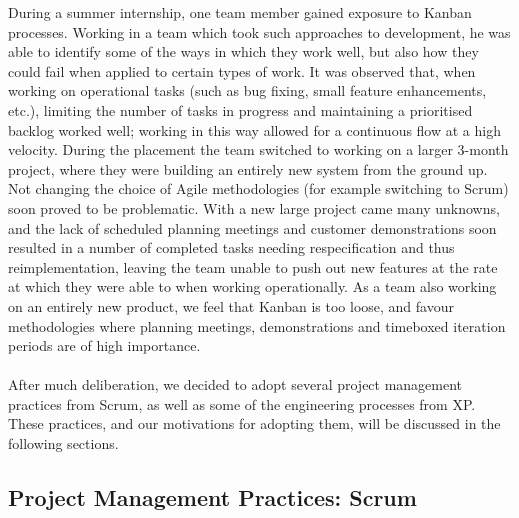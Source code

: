\documentclass[10pt]{article}
\begin{document}
During a summer internship, one team member gained exposure to Kanban processes. Working in a team which took such approaches to development, he was able to identify some of the ways in which they work well, but also how they could fail when applied to certain types of work. It was observed that, when working on operational tasks (such as bug fixing, small feature enhancements, etc.), limiting the number of tasks in progress and maintaining a prioritised backlog worked well; working in this way allowed for a continuous flow at a high velocity. During the placement the team switched to working on a larger 3-month project, where they were building an entirely new system from the ground up. Not changing the choice of Agile methodologies (for example switching to Scrum) soon proved to be problematic. With a new large project came many unknowns, and the lack of scheduled planning meetings and customer demonstrations soon resulted in a number of completed tasks needing respecification and thus reimplementation, leaving the team unable to push out new features at the rate at which they were able to when working operationally. As a team also working on an entirely new product, we feel that Kanban is too loose, and favour methodologies where planning meetings, demonstrations and timeboxed iteration periods are of high importance.\\\\
After much deliberation, we decided to adopt several project management practices from Scrum, as well as some of the engineering processes from XP. These practices, and our motivations for adopting them, will be discussed in the following sections.

\subsection{Project Management Practices: Scrum}
\end{document}
